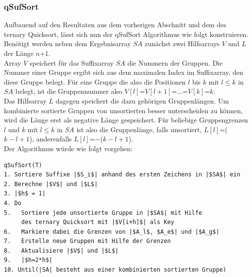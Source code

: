  \subsubsection{qSufSort}
Aufbauend auf den Resultaten aus dem vorherigen Abschnitt und dem des ternary Quicksort, lässt sich nun der qSufSort Algorithmus wie folgt konstruieren.
Benötigt werden neben dem Ergebnisarray $SA$ zunächst zwei Hilfsarrays $V$ und $L$ der Länge $n$+1.\\
Array $V$ speichert für das Suffixarray $SA$ die Nummern der Gruppen. Die Nummer einer Gruppe ergibt sich aus dem maximalen Index im Suffixarray, den diese Gruppe belegt. Für eine Gruppe die also die Positionen $l$ bis $k$ mit $l \leq k$ in $SA$ belegt, ist die Gruppennummer also $V[l]$=$V[l+1]$=...=$V[k]$=$k$.\\
Das Hilfsarray $L$ dagegen speichert die dazu gehörigen Gruppenlängen. Um kombinierte sortierte Gruppen von unsortierten besser unterscheiden zu können, wird die Länge erst als negative Länge gespeichert. Für beliebige Gruppengrenzen $l$ und $k$ mit $l \leq k$ in $SA$ ist also die Gruppenlänge, falls unsortiert, $L[l]$=($k-l+1$), anderenfalls $L[l]$=$-$($k-l+1$). \\
Der Algorithmus würde wie folgt vorgehen:\\

\begin{verbatim}
qSufSort(T)
1. Sortiere Suffixe |$S_i$| anhand des ersten Zeichens in |$SA$| ein 
2. Berechne |$V$| und |$L$|
3. |$h$ = 1|
4. Do  
5.   Sortiere jede unsortierte Gruppe in |$SA$| mit Hilfe
     des ternary Quicksort mit |$V[i+h]$| als Key
6.   Markiere dabei die Grenzen von |$A_l$, $A_e$| und |$A_g$|
7.   Erstelle neue Gruppen mit Hilfe der Grenzen
8.   Aktualisiere |$V$| und |$L$|
9.   |$h=2*h$|
10. Until(|SA| besteht aus einer kombinierten sortierten Gruppe)
\end{verbatim}

